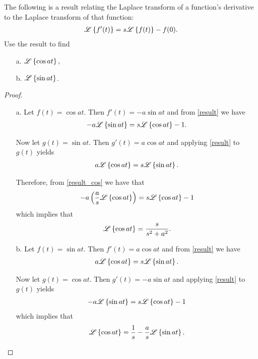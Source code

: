 \begin{problem}{3.3}
  The following is a result relating the Laplace transform of a function's derivative
  to the Laplace transform of that function:
  \begin{align}\label{result}
    \mathscr{L}\left\{ {f'(t)} \right\} = s \mathscr{L}\left\{ {f(t)} \right\} - f(0).
  \end{align}
  Use the result to find
  \begin{enumerate}
    \item[a.] $\mathscr{L}\left\{ {\cos at} \right\},$
    \item[b.] $\mathscr{L}\left\{ {\sin at} \right\}$.
  \end{enumerate}
\end{problem}

\begin{proof}
  \begin{enumerate}
    \item[a.] Let $f(t) = \cos at$. Then $f'(t) = -a \sin at$ and from \eqref{result}
      we have
      \begin{align}\label{result_cos}
        -a \mathscr{L}\left\{ {\sin at} \right\} = s \mathscr{L}\left\{ {\cos at} \right\} - 1.
      \end{align}

      Now let $g(t) = \sin at$. Then $g'(t) = a \cos at$ and applying \eqref{result} to
      $g(t)$ yields
      \begin{align*}
        a \mathscr{L}\left\{ {\cos at} \right\} = s \mathscr{L}\left\{ {\sin at} \right\}.
      \end{align*}

      Therefore, from \eqref{result_cos} we have that
      \begin{align*}
        -a \left(\frac{a}{s} \mathscr{L}\left\{ {\cos a t} \right\}\right) = s \mathscr{L}\left\{ {\cos at} \right\} - 1
      \end{align*}
      which implies that
      \begin{align*}
        \mathscr{L}\left\{ {\cos at} \right\} = \frac{s}{s^2 + a^2}.
      \end{align*}
    \item[b.]  Let $f(t) = \sin at$. Then $f'(t) = a \cos at$ and from \eqref{result}
      we have
      \begin{align}\label{result_sin}
        a \mathscr{L}\left\{ {\cos at} \right\} = s \mathscr{L}\left\{ {\sin at} \right\}.
      \end{align}

      Now let $g(t) = \cos at$. Then $g'(t) =- a \sin at$ and applying \eqref{result} to
      $g(t)$ yields
      \begin{align*}
        -a \mathscr{L}\left\{ {\sin at} \right\} = s \mathscr{L}\left\{ {\cos at} \right\} - 1
      \end{align*}
      which implies that
      \begin{align*}
        \mathscr{L}\left\{ {\cos at} \right\} = \frac{1}{s} - \frac{a}{s} \mathscr{L}\left\{ {\sin at} \right\}.
      \end{align*}


\end{enumerate}
\end{proof}
